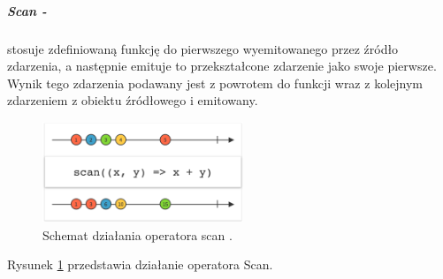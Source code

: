 \documentclass[12pt,oneside,a4paper]{report}
\begin{document}
\subparagraph{Scan -}stosuje zdefiniowaną funkcję do pierwszego wyemitowanego przez źródło zdarzenia, a następnie emituje to przekształcone zdarzenie jako swoje pierwsze. Wynik tego zdarzenia podawany jest z powrotem do funkcji wraz z kolejnym zdarzeniem z obiektu źródłowego i emitowany.
\begin{figure}[ht!]
	\centering
	\includegraphics[width=6cm]{scan}
	\caption{Schemat działania operatora scan \cite{marbles}.}
	\label{scan}
\end{figure}
Rysunek \ref{scan} przedstawia działanie operatora Scan.
\pagebreak
\end{document}
